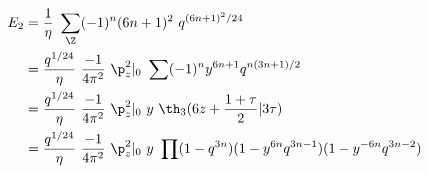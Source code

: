 \begin{equation}
  \begin{split}
    E_2 &={1\over\eta}~ \sum_\Z (-1)^n (6n+1)^2 ~q^{(6n+1)^2 /24}\\
    &= {q^{1/24}\over\eta}~{-1\over 4 \pi^2}~\p_z^2|_0
    ~\sum(-1)^n y^{6n+1} q^{n(3n+1)/2}\\
    &= {q^{1/24}\over\eta}~{-1\over 4 \pi^2}~\p_z^2|_0
    ~y~\th_3(6z+{1+\tau\over 2}|3\tau) \\
 &= {q^{1/24}\over\eta}~{-1\over 4 \pi^2}~\p_z^2|_0
    ~y~\prod  (1-q^{3n})(1-y^{6n}q^{3n-1})(1-y^{-6n}q^{3n-2}) 
  \end{split}
\end{equation}

